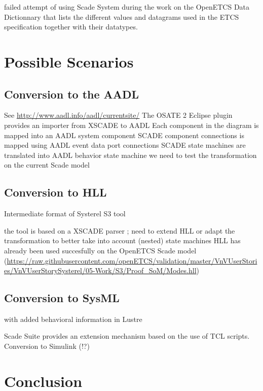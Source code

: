 \documentclass{template/openetcs_report}
\begin{document}
failed attempt of using Scade System during the work on the OpenETCS
Data Dictionnary that lists the different values and datagrams used in
the ETCS specification together with their datatypes.



\chapter{Possible Scenarios}
\label{cha:possible-scenarios}

\section{Conversion to the AADL}

See \url{http://www.aadl.info/aadl/currentsite/}
The OSATE 2 Eclipse plugin provides an importer from XSCADE to AADL
Each component in the diagram is mapped into an AADL system component
SCADE component connections is mapped using AADL event data port connections
SCADE state machines are translated into AADL behavior state machine
we need to test the transformation on the current Scade model

\section{Conversion to HLL}

Intermediate format of Systerel S3 tool

the tool is based on a XSCADE parser ; need to extend HLL or adapt the
transformation to better take into account (nested) state machines HLL
has already been used succesfully on the OpenETCS Scade model
(\url{https://raw.githubusercontent.com/openETCS/validation/master/VnVUserStories/VnVUserStorySysterel/05-Work/S3/Proof_SoM/Modes.hll})

\section{Conversion to SysML}

with added behavioral information in Lustre

Scade Suite provides an extension mechanism based on the use of TCL scripts.
Conversion to Simulink (!?)



\chapter{Conclusion}
\end{document}
